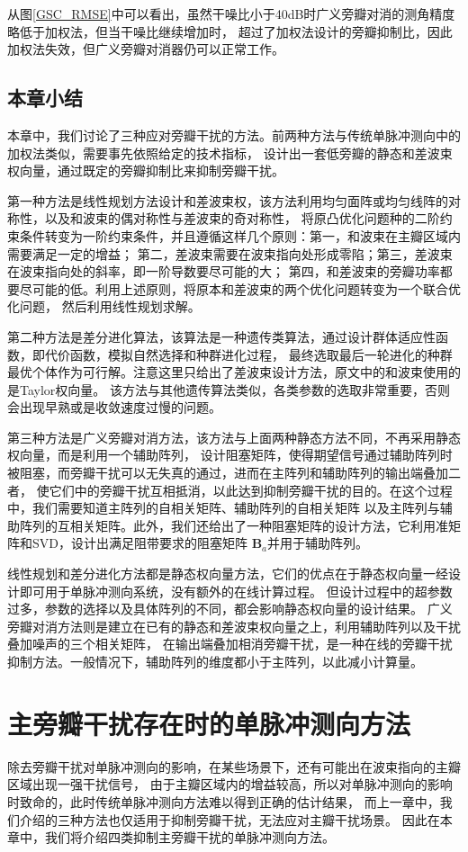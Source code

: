 \documentclass[master]{thesis-uestc}
\begin{document}
从图\ref{GSC_RMSE}中可以看出，虽然干噪比小于40dB时广义旁瓣对消的测角精度略低于加权法，但当干噪比继续增加时，
超过了加权法设计的旁瓣抑制比，因此加权法失效，但广义旁瓣对消器仍可以正常工作。

\section{本章小结}
本章中，我们讨论了三种应对旁瓣干扰的方法。前两种方法与传统单脉冲测向中的加权法类似，需要事先依照给定的技术指标，
设计出一套低旁瓣的静态和差波束权向量，通过既定的旁瓣抑制比来抑制旁瓣干扰。

第一种方法是线性规划方法设计和差波束权，该方法利用均匀面阵或均匀线阵的对称性，以及和波束的偶对称性与差波束的奇对称性，
将原凸优化问题种的二阶约束条件转变为一阶约束条件，并且遵循这样几个原则：第一，和波束在主瓣区域内需要满足一定的增益；
第二，差波束需要在波束指向处形成零陷；第三，差波束在波束指向处的斜率，即一阶导数要尽可能的大；
第四，和差波束的旁瓣功率都要尽可能的低。利用上述原则，将原本和差波束的两个优化问题转变为一个联合优化问题，
然后利用线性规划求解。

第二种方法是差分进化算法，该算法是一种遗传类算法，通过设计群体适应性函数，即代价函数，模拟自然选择和种群进化过程，
最终选取最后一轮进化的种群最优个体作为可行解。注意这里只给出了差波束设计方法，原文中的和波束使用的是Taylor权向量。
该方法与其他遗传算法类似，各类参数的选取非常重要，否则会出现早熟或是收敛速度过慢的问题。

第三种方法是广义旁瓣对消方法，该方法与上面两种静态方法不同，不再采用静态权向量，而是利用一个辅助阵列，
设计阻塞矩阵，使得期望信号通过辅助阵列时被阻塞，而旁瓣干扰可以无失真的通过，进而在主阵列和辅助阵列的输出端叠加二者，
使它们中的旁瓣干扰互相抵消，以此达到抑制旁瓣干扰的目的。在这个过程中，我们需要知道主阵列的自相关矩阵、辅助阵列的自相关矩阵
以及主阵列与辅助阵列的互相关矩阵。此外，我们还给出了一种阻塞矩阵的设计方法，它利用准矩阵和SVD，设计出满足阻带要求的阻塞矩阵
$\bm{B}_a$并用于辅助阵列。

线性规划和差分进化方法都是静态权向量方法，它们的优点在于静态权向量一经设计即可用于单脉冲测向系统，没有额外的在线计算过程。
但设计过程中的超参数过多，参数的选择以及具体阵列的不同，都会影响静态权向量的设计结果。
广义旁瓣对消方法则是建立在已有的静态和差波束权向量之上，利用辅助阵列以及干扰叠加噪声的三个相关矩阵，
在输出端叠加相消旁瓣干扰，是一种在线的旁瓣干扰抑制方法。一般情况下，辅助阵列的维度都小于主阵列，以此减小计算量。

\chapter{主旁瓣干扰存在时的单脉冲测向方法}
除去旁瓣干扰对单脉冲测向的影响，在某些场景下，还有可能出在波束指向的主瓣区域出现一强干扰信号，
由于主瓣区域内的增益较高，所以对单脉冲测向的影响时致命的，此时传统单脉冲测向方法难以得到正确的估计结果，
而上一章中，我们介绍的三种方法也仅适用于抑制旁瓣干扰，无法应对主瓣干扰场景。
因此在本章中，我们将介绍四类抑制主旁瓣干扰的单脉冲测向方法。
\end{document}

